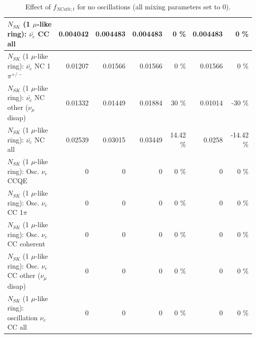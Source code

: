 \begin{table}
\begin{tabular}{| l | r | r | r  r | r  r |}
                            $N_{SK}$ (1 $\mu$-like ring): $\bar{\nu_{e}}$ CC all &        0.004042 &        0.004483 &        0.004483 &        0 \%  &        0.004483 &        0 \%  \\ 
\hline
                     $N_{SK}$ (1 $\mu$-like ring): $\bar{\nu_e}$ NC 1$\pi^{+/-}$ &         0.01207 &         0.01566 &         0.01566 &        0 \%  &         0.01566 &        0 \%  \\ 
          $N_{SK}$ (1 $\mu$-like ring): $\bar{\nu_e}$ NC other ($\nu_\mu$ disap) &         0.01332 &         0.01449 &         0.01884 &       30 \%  &         0.01014 &      -30 \%  \\ 
                            $N_{SK}$ (1 $\mu$-like ring): $\bar{\nu_{e}}$ NC all &         0.02539 &         0.03015 &         0.03449 &    14.42 \%  &          0.0258 &   -14.42 \%  \\ 
\hline
\hline
\hline
                                 $N_{SK}$ (1 $\mu$-like ring): Osc. $\nu_e$ CCQE &               0 &               0 &               0 &        0 \%  &               0 &        0 \%  \\ 
                            $N_{SK}$ (1 $\mu$-like ring): Osc. $\nu_e$ CC 1$\pi$ &               0 &               0 &               0 &        0 \%  &               0 &        0 \%  \\ 
                          $N_{SK}$ (1 $\mu$-like ring): Osc. $\nu_e$ CC coherent &               0 &               0 &               0 &        0 \%  &               0 &        0 \%  \\ 
           $N_{SK}$ (1 $\mu$-like ring): Osc. $\nu_e$ CC other ($\nu_\mu$ disap) &               0 &               0 &               0 &        0 \%  &               0 &        0 \%  \\ 
                        $N_{SK}$ (1 $\mu$-like ring): oscillation $\nu_e$ CC all &               0 &               0 &               0 &        0 \%  &               0 &        0 \%  \\ 
\hline
\hline
\end{tabular}
\caption{ Effect of $f_{NCoth; t}$ for no oscillations (all mixing parameters set to 0). }
\label{tab:num_xsec_norm_ncoth_1RmuT_3f_osc_t13:0}
\end{table}
\clearpage
